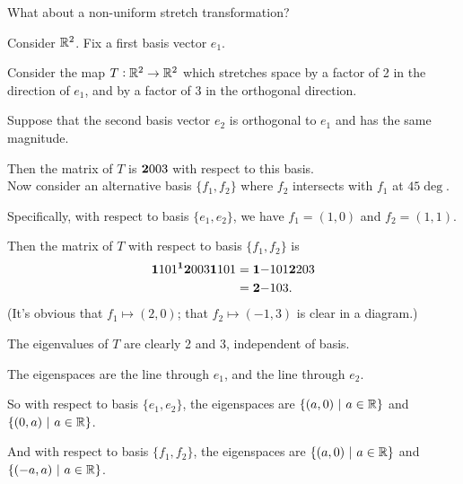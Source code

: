 What about a non-uniform stretch transformation?

\newpage
Consider $\mathbb{R}^2$. Fix a first basis vector $e_1$.

Consider the map $T:\mathbb{R}^2\to\mathbb{R}^2$ which stretches space by a factor of 2 in the
direction of $e_1$, and by a factor of 3 in the orthogonal direction.

Suppose that the second basis vector $e_2$ is orthogonal to $e_1$ and has the
same magnitude.

Then the matrix of $T$ is $\mathbf{2}{0}
                               {0}{3}$ with respect to this basis.
~\\

Now consider an alternative basis $\{f_1, f_2\}$ where $f_2$ intersects with
$f_1$ at $45\deg$.

Specifically, with respect to basis $\{e_1, e_2\}$, we have $f_1 = (1, 0)$ and
$f_2 = (1, 1)$.

Then the matrix of $T$ with respect to basis $\{f_1, f_2\}$ is
\begin{align*}
  \mathbf{1}{1}
      {0}{1}^{\mathbf 1} \mathbf{2}{0}
                    {0}{3} \mathbf{1}{1}
                               {0}{1} &=
  \mathbf{1}{-1}
      {0}{1}  \mathbf{2}{2}
                  {0}{3} \\ &=
  \mathbf{2}{-1}
      {0}{3}.
\end{align*}
(It's obvious that $f_1 \mapsto (2, 0)$; that $f_2 \mapsto (-1, 3)$ is clear in
a diagram.)

The eigenvalues of $T$ are clearly 2 and 3, independent of basis.

The eigenspaces are the line through $e_1$, and the line through $e_2$.

So with respect to basis $\{e_1, e_2\}$, the eigenspaces are
$\{(a, 0) ~|~ a \in \mathbb{R}\}$ and $\{(0, a) ~|~ a \in \mathbb{R}\}$.

And with respect to basis $\{f_1, f_2\}$, the eigenspaces are
$\{(a, 0) ~|~ a \in \mathbb{R}\}$ and $\{(-a, a) ~|~ a \in \mathbb{R}\}$.

\begin{comment}
  The characteristic polynomial is $\det(A - \lambda I) = 0$, where $A$ is a
  matrix of $T$ with respect to some basis. Let $A = \mat{2}{0}
  {0}{3}$. Then
  \begin{align*}
    \det(A - \lambda I) = \det \mat{2 - \lambda}{0}
    {0}{3 - \lambda} = (2 - \lambda)(3 - \lambda).
  \end{align*}
  So the eigenvalues are 2 and 3.

  The eigenspace $E_2$ with respect to basis $\{e_1, e_2\}$ is the set of
  solutions to
  \begin{align*}
    \mat{2}{0}
    {0}{3} \vecMM{x}{y} = \vecMM{2x}{2y}.
  \end{align*}
\end{comment}

